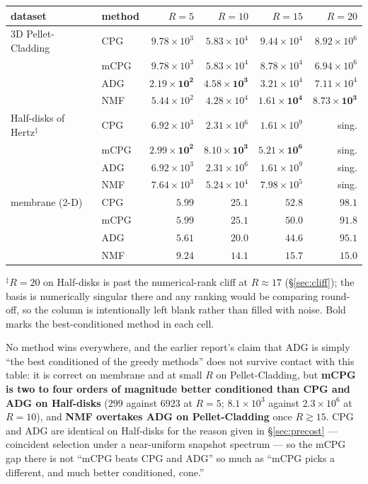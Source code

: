 \documentclass[11pt,a4paper]{article}
\begin{document}
\begin{center}
\begin{tabular}{@{}ll rrrr@{}}
\toprule
dataset & method & $R=5$ & $R=10$ & $R=15$ & $R=20$ \\
\midrule
3D Pellet-Cladding & CPG  & $9.78\!\times\!10^{3}$ & $5.83\!\times\!10^{4}$ & $9.44\!\times\!10^{4}$ & $8.92\!\times\!10^{6}$ \\
                   & mCPG & $9.78\!\times\!10^{3}$ & $5.83\!\times\!10^{4}$ & $8.78\!\times\!10^{4}$ & $6.94\!\times\!10^{6}$ \\
                   & ADG  & $\mathbf{2.19\!\times\!10^{2}}$ & $\mathbf{4.58\!\times\!10^{3}}$ & $3.21\!\times\!10^{4}$ & $7.11\!\times\!10^{4}$ \\
                   & NMF  & $5.44\!\times\!10^{2}$ & $4.28\!\times\!10^{4}$ & $\mathbf{1.61\!\times\!10^{4}}$ & $\mathbf{8.73\!\times\!10^{3}}$ \\
\midrule
Half-disks of Hertz$^\ddagger$ & CPG  & $6.92\!\times\!10^{3}$ & $2.31\!\times\!10^{6}$ & $1.61\!\times\!10^{9}$ & sing. \\
                    & mCPG & $\mathbf{2.99\!\times\!10^{2}}$ & $\mathbf{8.10\!\times\!10^{3}}$ & $\mathbf{5.21\!\times\!10^{6}}$ & sing. \\
                    & ADG  & $6.92\!\times\!10^{3}$ & $2.31\!\times\!10^{6}$ & $1.61\!\times\!10^{9}$ & sing. \\
                    & NMF  & $7.64\!\times\!10^{3}$ & $5.24\!\times\!10^{4}$ & $7.98\!\times\!10^{5}$ & sing. \\
\midrule
membrane (2-D) & CPG  & $5.99$ & $25.1$ & $52.8$ & $98.1$ \\
               & mCPG & $5.99$ & $25.1$ & $50.0$ & $91.8$ \\
               & ADG  & $\mathbf{5.61}$ & $\mathbf{20.0}$ & $\mathbf{44.6}$ & $\mathbf{95.1}$ \\
               & NMF  & $9.24$ & $14.1$ & $15.7$ & $15.0$ \\
\bottomrule
\end{tabular}
\end{center}
\noindent$^\ddagger$$R=20$ on Half-disks is past the numerical-rank cliff at $R\approx17$
(\S\ref{sec:cliff}); the basis is numerically singular there and any ranking would be
comparing round-off, so the column is intentionally left blank rather than filled with
noise. Bold marks the best-conditioned method in each cell.

\noindent No method wins everywhere, and the earlier report's claim that ADG is simply
``the best conditioned of the greedy methods'' does not survive contact with this table:
it is correct on membrane and at small $R$ on Pellet-Cladding, but \textbf{mCPG is two to
four orders of magnitude better conditioned than CPG and ADG on Half-disks} ($299$ against
$6923$ at $R=5$; $8.1\times10^{3}$ against $2.3\times10^{6}$ at $R=10$), and \textbf{NMF
overtakes ADG on Pellet-Cladding} once $R\gtrsim15$. CPG and ADG are identical on
Half-disks for the reason given in \S\ref{sec:precost} --- coincident selection under a
near-uniform snapshot spectrum --- so the mCPG gap there is not ``mCPG beats CPG and ADG''
so much as ``mCPG picks a different, and much better conditioned, cone.''
\end{document}
